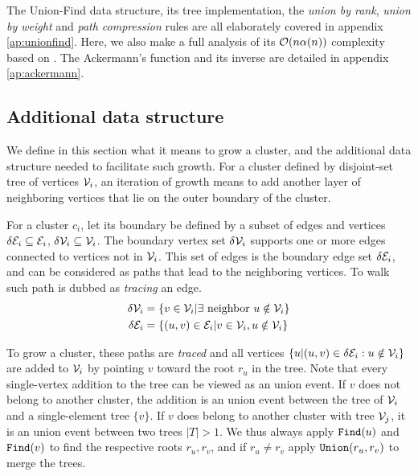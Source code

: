 The Union-Find data structure, its tree implementation, the \emph{union by rank}, \emph{union by weight} and \emph{path compression} rules are all elaborately covered in appendix \ref{ap:unionfind}. Here, we also make a full analysis of its $\mathcal{O}(n\alpha(n))$ complexity based on \cite{kozen1992design}. The Ackermann's function and its inverse are detailed in appendix \ref{ap:ackermann}.

\subsection{Additional data structure}\label{sec:ufdataextra}
We define in this section what it means to grow a cluster, and the additional data structure needed to facilitate such growth. For a cluster defined by disjoint-set tree of vertices $\mathcal{V}_i$, an iteration of growth means to add another layer of neighboring vertices that lie on the outer boundary of the cluster. 
\begin{definition}\label{def:clusterboud}
  For a cluster $c_i$, let its boundary be defined by a subset of edges and vertices $\delta \mathcal{E}_i \subseteq \mathcal{E}_i$, $\delta \mathcal{V}_i \subseteq \mathcal{V}_i$. The boundary vertex set $\delta \mathcal{V}_i$ supports one or more edges connected to vertices not in $\mathcal{V}_i$. This set of edges is the boundary edge set $\delta \mathcal{E}_i$, and can be considered as paths that lead to the neighboring vertices. To walk such path is dubbed as \emph{tracing} an edge. 
  \begin{align}
    \delta \mathcal{V}_i&= \left\{ v \in \mathcal{V}_i | \exists \text{ neighbor }  u \notin \mathcal{V}_i \right\} \\
    \delta \mathcal{E}_i &= \{(u,v)\in \mathcal{E}_i | v \in \mathcal{V}_i, u \notin \mathcal{V}_i \}
  \end{align}
\end{definition}
To grow a cluster, these paths are \emph{traced} and all vertices $\{u | (u,v) \in \delta \mathcal{E}_i: u \notin \mathcal{V}_i\}$ are added to $\mathcal{V}_i$ by pointing $v$ toward the root $r_u$ in the tree. Note that every single-vertex addition to the tree can be viewed as an union event. If $v$ does not belong to another cluster, the addition is an union event between the tree of $\mathcal{V}_i$ and a single-element tree $\{v\}$. If $v$ does belong to another cluster with tree $\mathcal{V}_j$, it is an union event between two trees $|T|>1$. We thus always apply $\texttt{Find}(u)$ and $\texttt{Find}(v)$ to find the respective roots $r_u, r_v$, and if $r_u\neq r_v$ apply $\texttt{Union}(r_u, r_v)$ to merge the trees.

